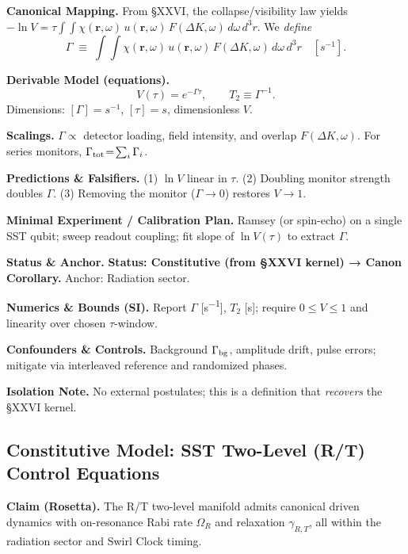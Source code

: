 \documentclass[10pt,reprint,aps,onecolumn,nofootinbib]{revtex4-2}
\begin{document}
        \textbf{Canonical Mapping.}
        From §XXVI, the collapse/visibility law yields $-\ln V = \tau\!\int\!\!\int \chi(\mathbf r,\omega)\,u(\mathbf r,\omega)\,F(\Delta K,\omega)\, d\omega\, d^3r$. We \emph{define}
        \[
            \Gamma \;\equiv\; \int\!\!\int \chi(\mathbf r,\omega)\,u(\mathbf r,\omega)\,F(\Delta K,\omega)\, d\omega\, d^3r \quad[\si{s^{-1}}] .
        \]

        \textbf{Derivable Model (equations).}
        \[
            V(\tau) = e^{-\Gamma \tau} ,\qquad T_2 \equiv \Gamma^{-1} .
        \]
        Dimensions: $[\Gamma]=\si{s^{-1}}$, $[\tau]=\si{s}$, dimensionless $V$.

        \textbf{Scalings.}
        \;$\Gamma \propto$ detector loading, field intensity, and overlap $F(\Delta K,\omega)$. For series monitors, $\Gamma_{\rm tot}\!=\!\sum_i \Gamma_i$.

        \textbf{Predictions \& Falsifiers.}
        (1) $\ln V$ linear in $\tau$. (2) Doubling monitor strength doubles $\Gamma$. (3) Removing the monitor ($\Gamma\!\to\!0$) restores $V\!\to\!1$.

        \textbf{Minimal Experiment / Calibration Plan.}
        Ramsey (or spin-echo) on a single SST qubit; sweep readout coupling; fit slope of $\ln V(\tau)$ to extract $\Gamma$.

        \textbf{Status \& Anchor.}
        \textbf{Status: Constitutive (from §XXVI kernel) → Canon Corollary.} Anchor: Radiation sector.

        \textbf{Numerics \& Bounds (SI).}
        Report $\Gamma$ [\si{s^{-1}}], $T_2$ [\si{s}]; require $0\!\le\!V\!\le\!1$ and linearity over chosen $\tau$-window.

        \textbf{Confounders \& Controls.}
        Background $\Gamma_{\rm bg}$, amplitude drift, pulse errors; mitigate via interleaved reference and randomized phases.

        \textbf{Isolation Note.}
        No external postulates; this is a definition that \emph{recovers} the §XXVI kernel.


    \subsection*{Constitutive Model: SST Two-Level (R/T) Control Equations}

        \textbf{Claim (Rosetta).}
        The R/T two-level manifold admits canonical driven dynamics with on-resonance Rabi rate $\Omega_R$ and relaxation $\gamma_{R,T}$, all within the radiation sector and Swirl Clock timing.
\end{document}
